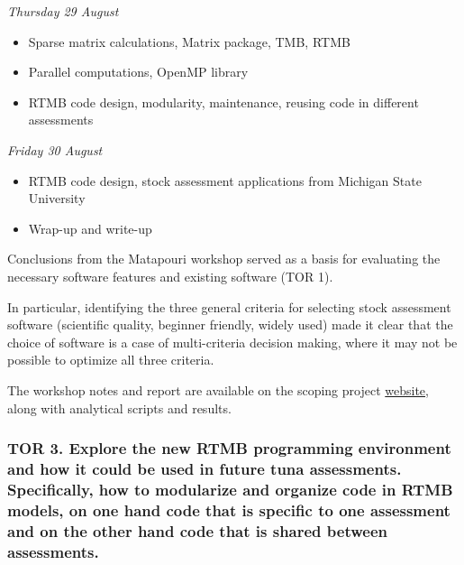 \documentclass{SCreport}
\newcommand\tree
{https://github.com/PacificCommunity/ofp-sam-transition-plan/tree/main}
\begin{document}
\textit{Thursday 29 August}\\[-4ex]

\begin{itemize}
  \item[] Sparse matrix calculations, Matrix package, TMB, RTMB\\[-4.5ex]
  \item[] Parallel computations, OpenMP library\\[-4.5ex]
  \item[] RTMB code design, modularity, maintenance, reusing code in different
  assessments\\[-2.5ex]
\end{itemize}

\textit{Friday 30 August}\\[-4ex]

\begin{itemize}
  \item[] RTMB code design, stock assessment applications from Michigan State
  University\\[-4.5ex]
  \item[] Wrap-up and write-up
\end{itemize}

Conclusions from the Matapouri workshop served as a basis for evaluating the
necessary software features and existing software (TOR 1).

In particular, identifying the three general criteria for selecting stock
assessment software (scientific quality, beginner friendly, widely used) made it
clear that the choice of software is a case of multi-criteria decision making,
where it may not be possible to optimize all three criteria.

The workshop notes and report are available on the scoping project
\href{\tree/workshops/2024-08-matapouri}{website}, along with analytical scripts
and results.

\vspace{1ex}

\subsubsection{TOR 3. Explore the new RTMB programming environment and how it
  could be used in future tuna assessments. Specifically, how to modularize and
  organize code in RTMB models, on one hand code that is specific to one
  assessment and on the other hand code that is shared between assessments.}

\vspace{1ex}
\end{document}
